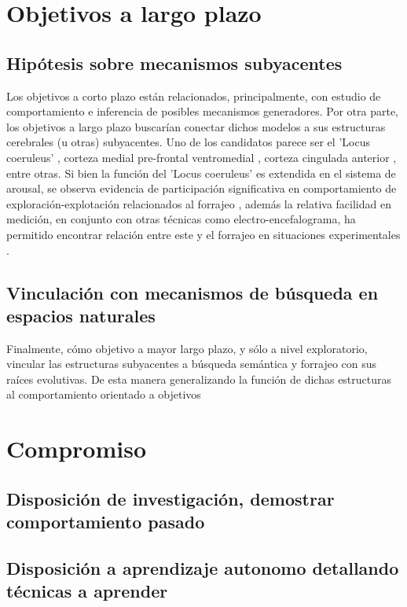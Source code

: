 \documentclass[11pt]{article}
\begin{document}
\section{Objetivos a largo plazo}
\label{sec:org78c6fe1}
\subsection{Hipótesis sobre mecanismos subyacentes}
\label{sec:orgda89443}
Los objetivos a corto plazo están relacionados, principalmente, con estudio de
comportamiento e inferencia de posibles mecanismos generadores. Por otra parte,
los objetivos a largo plazo buscarían conectar dichos modelos a sus estructuras
cerebrales (u otras) subyacentes. Uno de los candidatos parece ser el 'Locus
coeruleus' \citep{kaneIncreasedLocusCoeruleus2017}, corteza medial pre-frontal
ventromedial \citep{kollingNeuralMechanismsForaging2012}, corteza cingulada
anterior \citep{shenhavAnteriorCingulateEngagement2014}, entre otras. Si bien la
función del 'Locus coeruleus' es extendida en el sistema de arousal, se observa
evidencia de participación significativa en comportamiento de
exploración-explotación relacionados al forrajeo
\citep{aston-jonesAdaptiveGainRole2005}, además la relativa facilidad en medición,
en conjunto con otras técnicas como electro-encefalograma, ha permitido
encontrar relación entre este y el forrajeo en situaciones experimentales
\citep{slanziCombiningEyeTracking2017}.
\subsection{Vinculación con mecanismos de búsqueda en espacios naturales}
\label{sec:orga5d7bdf}

Finalmente, cómo objetivo a mayor largo plazo, y sólo a nivel exploratorio,
vincular las estructuras subyacentes a búsqueda semántica y forrajeo con sus
raíces evolutivas. De esta manera generalizando la función de dichas estructuras
al comportamiento orientado a objetivos \citep{hillsAnimalForagingEvolution2006} 
\section{Compromiso}
\label{sec:org8d1befe}
\subsection{Disposición de investigación, demostrar comportamiento pasado}
\label{sec:org4989e49}
\subsection{Disposición a aprendizaje autonomo detallando técnicas a aprender}
\label{sec:orgf1c737a}


\end{document}
